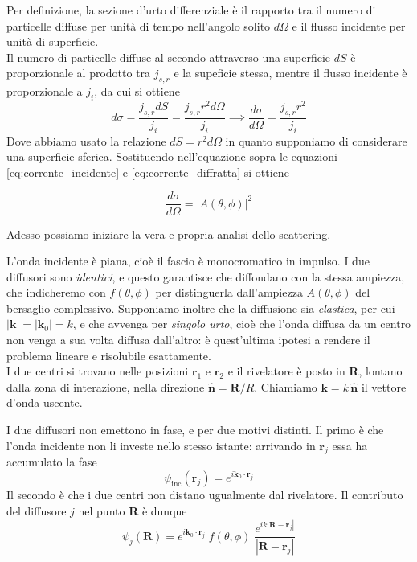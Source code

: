Per definizione, la sezione d'urto differenziale è il rapporto tra il numero di particelle diffuse per unità di tempo nell'angolo solito $d\Omega$ e il flusso incidente per unità di superficie. \\
Il numero di particelle diffuse al secondo attraverso una superficie $dS$ è proporzionale al prodotto tra $j_{s,r}$ e la supeficie stessa, mentre il flusso incidente è proporzionale a $j_i$, da cui si ottiene 
\begin{equation}
    d\sigma = \frac{j_{s,r} dS}{j_i} = \frac{j_{s,r} r^2 d\Omega}{j_i} \implies \frac{d\sigma}{d\Omega} = \frac{j_{s,r} r^2}{j_i}
\end{equation}
Dove abbiamo usato la relazione $dS = r^2 d\Omega$ in quanto supponiamo di considerare una superficie sferica. Sostituendo nell'equazione sopra le equazioni \eqref{eq:corrente_incidente} e \eqref{eq:corrente_diffratta} si ottiene 
\begin{tcolorbox}[colback=black!5!white, colframe=black!45!white, boxrule=0.8pt]
\begin{equation}
    \frac{d\sigma}{d\Omega} = |A(\theta, \phi)|^2
\end{equation}
\end{tcolorbox}

Adesso possiamo iniziare la vera e propria analisi dello scattering. 

L'onda incidente è piana, cioè il fascio è monocromatico in impulso. I due diffusori sono \emph{identici}, e questo garantisce che diffondano con la stessa ampiezza, che indicheremo con $f(\theta,\phi)$ per distinguerla dall'ampiezza $A(\theta,\phi)$ del bersaglio complessivo. Supponiamo inoltre che la diffusione sia \emph{elastica}, per cui $|\mathbf{k}| = |\mathbf{k}_0| = k$, e che avvenga per \emph{singolo urto}, cioè che l'onda diffusa da un centro non venga a sua volta diffusa dall'altro: è quest'ultima ipotesi a rendere il problema lineare e risolubile esattamente.\\

I due centri si trovano nelle posizioni $\mathbf{r}_1$ e $\mathbf{r}_2$ e il rivelatore è posto in $\mathbf{R}$, lontano dalla zona di interazione, nella direzione $\hat{\mathbf{n}} = \mathbf{R}/R$. Chiamiamo $\mathbf{k} = k\,\hat{\mathbf{n}}$ il vettore d'onda uscente.

I due diffusori non emettono in fase, e per due motivi distinti. Il primo è che l'onda incidente non li investe nello stesso istante: arrivando in $\mathbf{r}_j$ essa ha accumulato la fase
%
\begin{equation}
    \psi_{\text{inc}}(\mathbf{r}_j) = e^{i\mathbf{k}_0\cdot\mathbf{r}_j}
    \label{eq:fase_incidente}
\end{equation}
Il secondo è che i due centri non distano ugualmente dal rivelatore. Il contributo del diffusore $j$ nel punto $\mathbf{R}$ è dunque
%
\begin{equation}
    \psi_j(\mathbf{R}) = e^{i\mathbf{k}_0\cdot\mathbf{r}_j}\; f(\theta,\phi)\; \frac{e^{ik\left|\mathbf{R}-\mathbf{r}_j\right|}}{\left|\mathbf{R}-\mathbf{r}_j\right|}
    \label{eq:contributo_j}
\end{equation}

